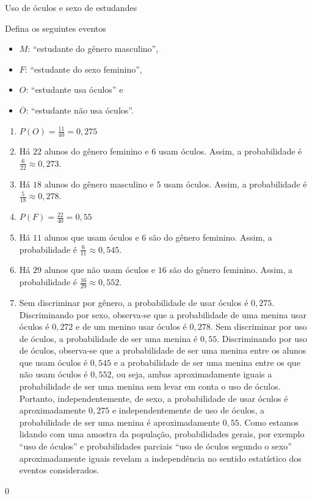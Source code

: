 \begin{answer}{Uso de óculos e sexo de estudandes}
{
Defina os seguintes eventos

\begin{itemize}
\item $M$: “estudante do gênero masculino”, 
\item $F$: “estudante do sexo feminino”,
\item $O$: “estudante usa óculos”{} e 
\item $\overline{O}$: “estudante não usa óculos”.
\end{itemize}

\begin{enumerate}
\item $P(O)=\frac{11}{40}=0{,}275$
\item Há $22$ alunos do gênero feminino e 6 usam óculos. Assim, a probabilidade é $\frac{6}{22}\approx0{,}273$.
\item Há $18$ alunos do gênero masculino e $5$ usam óculos. Assim, a probabilidade é $\frac{5}{18}\approx0{,}278$.
\item $P(F)=\frac{22}{40}=0{,}55$
\item Há $11$ alunos que usam óculos e 6 são do gênero feminino. Assim, a probabilidade é $\frac{6}{11}\approx0{,}545$.
\item Há $29$ alunos que não usam óculos e $16$ são do gênero feminino. Assim, a probabilidade é $\frac{16}{29}\approx0{,}552$.
\item Sem discriminar por gênero, a probabilidade de usar óculos é $0{,}275$. Discriminando por sexo, observa-se que a probabilidade de uma menina usar óculos é $0{,}272$ e de um menino usar óculos é $0{,}278$. Sem discriminar por uso de óculos, a probabilidade de ser uma menina é $0{,}55$. Discriminando por uso de óculos, observa-se que a probabilidade de ser uma menina entre os alunos que usam óculos é $0{,}545$ e a probabilidade de ser uma menina entre os que não usam óculos é $0{,}552$, ou seja, ambas aproximadamente iguais a probabilidade de ser uma menina sem levar em conta o uso de óculos. Portanto, independentemente, de sexo, a probabilidade de usar óculos é aproximadamente $0{,}275$ e independentemente de uso de óculos, a probabilidade de ser uma menina é aproximadamente $0{,}55$. Como estamos lidando com uma amostra da população, probabilidades gerais, por exemplo “uso de óculos”{} e probabilidades parciais “uso de óculos segundo o sexo”{} aproximadamente iguais revelam a independência no sentido estatístico dos eventos considerados.
\end{enumerate}
}{0}
\end{answer}


